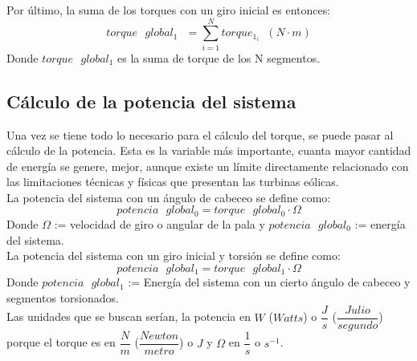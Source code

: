 Por último, la suma de los torques con un giro inicial es entonces:
\begin{equation}
  torque \text{ } global_1 \text{ } = \sum_{i=1}^{N} torque_{1_i} \hspace{7pt} (N \cdot m)
 \label{def:torque_global_1}
\end{equation}
Donde $torque \text{ } global_1$ es la suma de torque de los N segmentos.





















\subsection{Cálculo de la potencia del sistema}
\label{section:pot_sistema}

 
 Una vez se tiene todo lo necesario para el cálculo del torque, se puede pasar al cálculo de la potencia. Esta es la variable más importante, cuanta mayor cantidad de energía se genere, mejor, aunque existe un límite directamente relacionado con las limitaciones técnicas y físicas que presentan las turbinas eólicas. \\
 
 
  La potencia del sistema con un ángulo de cabeceo se define como:
  \begin{equation}
  potencia \text{ } global_0 = torque \text{ } global_0 \cdot \Omega  
 \label{def:potencia_giro_inicial}
 \end{equation}
  Donde $\Omega$ := velocidad de giro o angular de la pala y $potencia \text{ } global_0$ := energía del sistema.\\
 
  La potencia del sistema con un giro inicial y torsión se define como:
   \begin{equation}
  potencia \text{ } global_1 = torque \text{ } global_1 \cdot \Omega  
 \label{def:potencia_giro_segmentos}
 \end{equation}
  Donde $potencia \text{ } global_1$ := Energía del sistema con un cierto ángulo de cabeceo y segmentos torsionados.\\
 
Las unidades que se buscan serían, la potencia en $W$ ($Watts$) o $\dfrac{J}{s}$ ($\dfrac{Julio}{segundo}$) porque el torque es en $\dfrac{N}{m}$ ($\dfrac{Newton}{metro}$) o $J$ y $\Omega$ en $\dfrac{1}{s}$ o $s^{-1}$.

